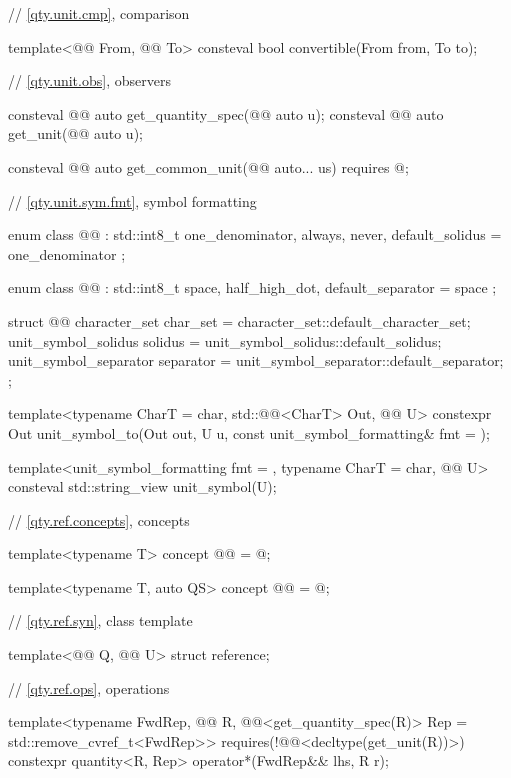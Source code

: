 \begin{codeblock}
{// \ref{qty.unit.cmp}, comparison

template<@@ From, @@ To>
consteval bool convertible(From from, To to);

// \ref{qty.unit.obs}, observers

consteval @@ auto get_quantity_spec(@@ auto u);
consteval @@ auto get_unit(@@ auto u);

consteval @@ auto get_common_unit(@@ auto... us)
  requires @\seebelownc@;

// \ref{qty.unit.sym.fmt}, symbol formatting

enum class @@ : std::int8_t {
  one_denominator,
  always,
  never,
  default_solidus = one_denominator
};

enum class @@ : std::int8_t {
  space,
  half_high_dot,
  default_separator = space
};

struct @@ {
  character_set char_set = character_set::default_character_set;
  unit_symbol_solidus solidus = unit_symbol_solidus::default_solidus;
  unit_symbol_separator separator = unit_symbol_separator::default_separator;
};

template<typename CharT = char, std::@@<CharT> Out, @@ U>
constexpr Out unit_symbol_to(Out out, U u, const unit_symbol_formatting& fmt = {});

template<unit_symbol_formatting fmt = {}, typename CharT = char, @@ U>
consteval std::string_view unit_symbol(U);

// \ref{qty.ref.concepts}, concepts

template<typename T>
concept @@ = @\seebelownc@;

template<typename T, auto QS>
concept @@ = @\seebelownc@;

// \ref{qty.ref.syn}, class template 

template<@@ Q, @@ U>
struct reference;

// \ref{qty.ref.ops}, operations

template<typename FwdRep, @@ R,
         @@<get_quantity_spec(R{})> Rep = std::remove_cvref_t<FwdRep>>
  requires(!@@<decltype(get_unit(R{}))>)
constexpr quantity<R{}, Rep> operator*(FwdRep&& lhs, R r);

}
\end{codeblock}
